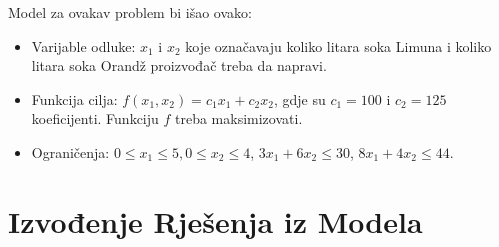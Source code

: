\documentclass[a4paper, utf8, 11pt, colorlinks]{book}
\begin{document}
Model za ovakav problem bi išao ovako:
\begin{itemize}
    \item 
Varijable odluke: $x_1$ i $x_2$ koje označavaju koliko litara soka Limuna i koliko litara soka Orandž proizvođač treba da napravi.  
\item Funkcija cilja: $f(x_1, x_2) = c_1x_1 + c_2 x_2$, gdje su $c_1 = 100$ i  $c_2 = 125$ koeficijenti. Funkciju $f$ treba maksimizovati. \\
\item Ograničenja: $0 \leq x_1 \leq 5, 0 \leq x_2 \leq 4$,   $3 x_1 + 6 x_2 \leq 30$, $8 x_1 + 4 x_2 \leq 44.$
\end{itemize}

\section{Izvođenje Rješenja iz Modela}
\end{document}
